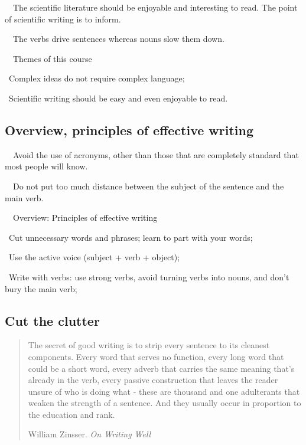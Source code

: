 \documentclass[a4paper, 12pt]{article}
\begin{document}
\par\ \textbullet\ The scientific literature should be enjoyable and interesting to read. The point of scientific writing is to inform.

\par\ \textbullet\ The verbs drive sentences whereas nouns slow them down.

\par\ \textbullet\ Themes of this course
\par\quad\textopenbullet\ Complex ideas do not require complex language;
\par\quad\textopenbullet\ Scientific writing should be easy and even enjoyable to read.

\subsection{Overview, principles of effective writing}

\par\ \textbullet\ Avoid the use of acronyms, other than those that are completely standard that most people will know.

\par\ \textbullet\ Do not put too much distance between the subject of the sentence and the main verb.

\par\ \textbullet\ Overview: Principles of effective writing
\par\quad\textopenbullet\ Cut unnecessary words and phrases; learn to part with your words;
\par\quad\textopenbullet\ Use the active voice (subject + verb + object);
\par\quad\textopenbullet\ Write with verbs: use strong verbs, avoid turning verbs into nouns, and don't bury the main verb;

\newpage\subsection{Cut the clutter}

\vspace{4pt}\begin{quote}
The secret of good writing is to strip every sentence to its cleanest components. 
Every word that serves no function, every long word that could be a short word, 
every adverb that carries the same meaning that's already in the verb, 
every passive construction that leaves the reader unsure of who is doing what
- these are thousand and one adulterants that weaken the strength of a sentence. 
And they usually occur in proportion to the education and rank. 
\begin{flushright}
William Zinsser. \textit{On Writing Well}
\end{flushright}
\end{quote}
\end{document}

